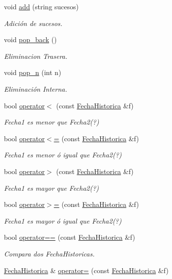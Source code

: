 \begin{DoxyCompactItemize}
void \hyperlink{classFechaHistorica_ad69f7b15d79d9329f03fc948b620b78f}{add} (string sucesos)
\begin{DoxyCompactList}\small\item\em Adición de sucesos. \end{DoxyCompactList}\item 
void \hyperlink{classFechaHistorica_adb9bbf902dc5fe70e96aadeff57ce530}{pop\+\_\+back} ()
\begin{DoxyCompactList}\small\item\em Eliminacion Trasera. \end{DoxyCompactList}\item 
void \hyperlink{classFechaHistorica_a98e9e2191117ed696f09c8d61f1742b2}{pop\+\_\+n} (int n)
\begin{DoxyCompactList}\small\item\em Eliminación Interna. \end{DoxyCompactList}\item 
bool \hyperlink{classFechaHistorica_ab37db2253eb8061611ad132243b10242}{operator$<$} (const \hyperlink{classFechaHistorica}{Fecha\+Historica} \&f)
\begin{DoxyCompactList}\small\item\em Fecha1 es menor que Fecha2(?) \end{DoxyCompactList}\item 
bool \hyperlink{classFechaHistorica_aa1a467a5bc0e76ae1fd2a81b9c9c4d61}{operator$<$=} (const \hyperlink{classFechaHistorica}{Fecha\+Historica} \&f)
\begin{DoxyCompactList}\small\item\em Fecha1 es menor ó igual que Fecha2(?) \end{DoxyCompactList}\item 
bool \hyperlink{classFechaHistorica_a64f8f42d6c4609f323d47b58dbac811f}{operator$>$} (const \hyperlink{classFechaHistorica}{Fecha\+Historica} \&f)
\begin{DoxyCompactList}\small\item\em Fecha1 es mayor que Fecha2(?) \end{DoxyCompactList}\item 
bool \hyperlink{classFechaHistorica_a78073b10eb11db05032a309e4ec544cf}{operator$>$=} (const \hyperlink{classFechaHistorica}{Fecha\+Historica} \&f)
\begin{DoxyCompactList}\small\item\em Fecha1 es mayor ó igual que Fecha2(?) \end{DoxyCompactList}\item 
bool \hyperlink{classFechaHistorica_ab1c2bab13fc15d200860b37f61988504}{operator==} (const \hyperlink{classFechaHistorica}{Fecha\+Historica} \&f)
\begin{DoxyCompactList}\small\item\em Compara dos Fecha\+Historicas. \end{DoxyCompactList}\item 
\hyperlink{classFechaHistorica}{Fecha\+Historica} \& \hyperlink{classFechaHistorica_a712415b87f836c744f47b697ef0ff2aa}{operator=} (const \hyperlink{classFechaHistorica}{Fecha\+Historica} \&f)
\end{DoxyCompactItemize}
